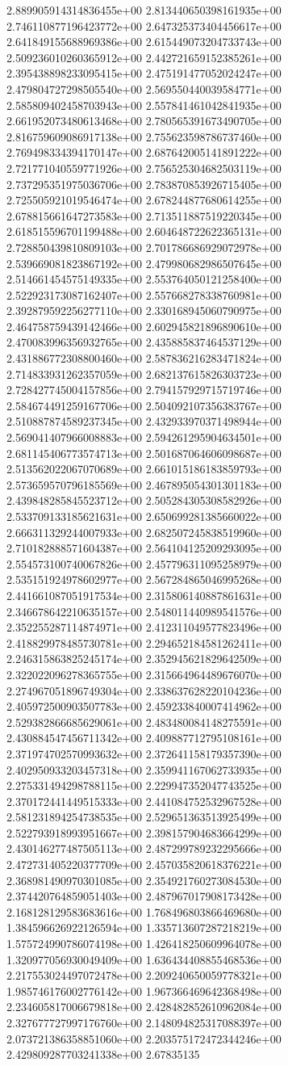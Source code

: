 	2.889905914314836455e+00	2.813440650398161935e+00	2.746110877196423772e+00	2.647325373404456617e+00	2.641849155688969386e+00	2.615449073204733743e+00	2.509236010260365912e+00	2.442721659152385261e+00	2.395438898233095415e+00	2.475191477052024247e+00	2.479804727298505540e+00	2.569550440039584771e+00	2.585809402458703943e+00	2.557841461042841935e+00	2.661952073480613468e+00	2.780565391673490705e+00	2.816759609086917138e+00	2.755623598786737460e+00	2.769498334394170147e+00	2.687642005141891222e+00	2.721771040559771926e+00	2.756525304682503119e+00	2.737295351975036706e+00	2.783870853926715405e+00	2.725505921019546474e+00	2.678244877680614255e+00	2.678815661647273583e+00	2.713511887519220345e+00	2.618515596701199488e+00	2.604648722622365131e+00	2.728850439810809103e+00	2.701786686929072978e+00	2.539669081823867192e+00	2.479980682986507645e+00	2.514661454575149335e+00	2.553764050121258400e+00	2.522923173087162407e+00	2.557668278338760981e+00	2.392879592256277110e+00	2.330168945060790975e+00	2.464758759439142466e+00	2.602945821896890610e+00	2.470083996356932765e+00	2.435885837464537129e+00	2.431886772308800460e+00	2.587836216283471824e+00	2.714833931262357059e+00	2.682137615826303723e+00	2.728427745004157856e+00	2.794157929715719746e+00	2.584674491259167706e+00	2.504092107356383767e+00	2.510887874589237345e+00	2.432933970371498944e+00	2.569041407966008883e+00	2.594261295904634501e+00	2.681145406773574713e+00	2.501687064606098687e+00	2.513562022067070689e+00	2.661015186183859793e+00	2.573659570796185569e+00	2.467895054301301183e+00	2.439848285845523712e+00	2.505284305308582926e+00	2.533709133185621631e+00	2.650699281385660022e+00	2.666311329244007933e+00	2.682507245838519960e+00	2.710182888571604387e+00	2.564104125209293095e+00	2.554573100740067826e+00	2.457796311095258979e+00	2.535151924978602977e+00	2.567284865046995268e+00	2.441661087051917534e+00	2.315806140887861631e+00	2.346678642210635157e+00	2.548011440989541576e+00	2.352255287114874971e+00	2.412311049577823496e+00	2.418829978485730781e+00	2.294652184581262411e+00	2.246315863825245174e+00	2.352945621829642509e+00	2.322022096278365755e+00	2.315664964489676070e+00	2.274967051896749304e+00	2.338637628220104236e+00	2.405972500903507783e+00	2.459233840007414962e+00	2.529382866685629061e+00	2.483480084148275591e+00	2.430884547456711342e+00	2.409887712795108161e+00	2.371974702570993632e+00	2.372641158179357390e+00	2.402950933203457318e+00	2.359941167062733935e+00	2.275331494298788115e+00	2.229947352047743525e+00	2.370172441449515333e+00	2.441084752532967528e+00	2.581231894254738535e+00	2.529651363513925499e+00	2.522793918993951667e+00	2.398157904683664299e+00	2.430146277487505113e+00	2.487299789232295666e+00	2.472731405220377709e+00	2.457035820618376221e+00	2.368981490970301085e+00	2.354921760273084530e+00	2.374420764859051403e+00	2.487967017908173428e+00	2.168128129583683616e+00	1.768496803866469680e+00	1.384596626922126594e+00	1.335713607287218219e+00	1.575724990786074198e+00	1.426418250609964078e+00	1.320977056930049409e+00	1.636434408855468536e+00	2.217553024497072478e+00	2.209240650059778321e+00	1.985746176002776142e+00	1.967366469642368498e+00	2.234605817006679818e+00	2.428482852610962084e+00	2.327677727997176760e+00	2.148094825317088397e+00	2.073721386358851060e+00	2.203575172472344246e+00	2.429809287703241338e+00	2.67835135